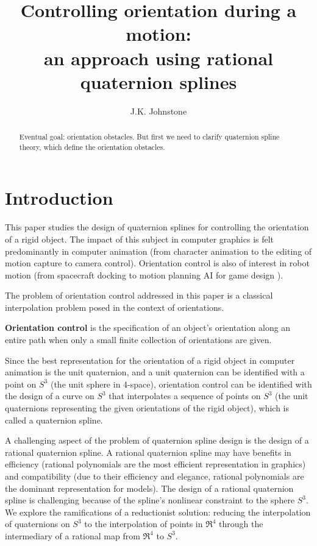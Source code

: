 \documentclass[12pt]{article}
\title{Controlling orientation during a motion:\\ 
       an approach using rational quaternion splines}
\author{J.K. Johnstone}
\begin{document}
\maketitle


\begin{abstract}
Eventual goal: orientation obstacles.
But first we need to clarify quaternion spline theory, which define the
orientation obstacles.
\end{abstract}

\section{Introduction}

This paper studies the design of quaternion splines for controlling the orientation
of a rigid object.
The impact of this subject in computer graphics is felt predominantly 
in computer animation (from character animation \cite{catmull, elaborations on sig78}
to the editing of motion capture \cite{gleicher} to camera control).
Orientation control is also of interest in robot motion (from spacecraft docking 
\cite{junkins?} to motion planning AI for game design \cite{game design book}).

The problem of orientation control addressed in this paper is a classical 
interpolation problem posed in the context of orientations.
%
\begin{defn2}
{\bf Orientation control} is the specification of an object's orientation along
an entire path when only a small finite collection of orientations are given.
\end{defn2}
%
Since the best representation for the orientation of a rigid object in computer animation
is the unit quaternion,
and a unit quaternion can be identified with a point on $S^3$ (the unit sphere 
in 4-space), orientation control can be identified with the design of a curve on $S^3$
that interpolates a sequence of points on $S^3$ (the unit quaternions representing
the given orientations of the rigid object), which is called a quaternion spline.

A challenging aspect of the problem of quaternion spline design is
the design of a rational quaternion spline.
A rational quaternion spline may have benefits in efficiency
(rational polynomials are the most efficient representation in graphics)
and compatibility (due to their efficiency and elegance, rational polynomials are
the dominant representation for models).
The design of a rational quaternion spline is challenging because 
of the spline's nonlinear constraint to the sphere $S^3$.
We explore the ramifications of a reductionist solution:
reducing the interpolation of quaternions on $S^3$ to the interpolation of
points in $\Re^4$ through the intermediary of a rational map from $\Re^4$ to $S^3$.
\end{document}
